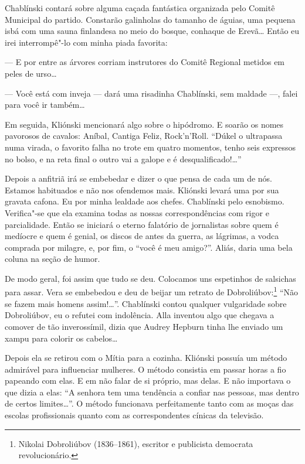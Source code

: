 Chablínski contará sobre alguma caçada fantástica organizada pelo Comitê Municipal do
partido. Constarão galinholas do tamanho de águias, uma pequena isbá com
uma sauna finlandesa no meio do bosque, conhaque de Erevã\ldots{} Então eu
irei interrompê"-lo com minha piada favorita:

--- E por entre as árvores corriam instrutores do Comitê Regional
metidos em peles de urso\ldots{}

--- Você está com inveja --- dará uma risadinha Chablínski, sem maldade
---, falei para você ir também\ldots{}

Em seguida, Kliónski mencionará algo sobre o hipódromo. E soarão os
nomes pavorosos de cavalos: Aníbal, Cantiga Feliz, Rock'n'Roll. ``Dúkel o ultrapassa numa virada, o favorito falha no trote em quatro momentos, tenho seis expressos no bolso, e na reta final o outro vai a galope e é desqualificado!\ldots{}''

Depois a anfitriã irá se embebedar e dizer o que pensa de cada um de
nós. Estamos habituados e não nos ofendemos mais. Kliónski levará uma
por sua gravata cafona. Eu por minha lealdade aos chefes. Chablínski
pelo esnobismo. Verifica"-se que ela examina todas as nossas
correspondências com rigor e parcialidade. Então se iniciará o eterno
falatório de jornalistas sobre quem é medíocre e quem é genial, os
discos de antes da guerra, as lágrimas, a vodca comprada por milagre, e,
por fim, o ``você é meu amigo?''. Aliás, daria uma bela coluna na seção
de humor.

De modo geral, foi assim que tudo se deu. Colocamos uns espetinhos de
salsichas para assar. Vera se embebedou e deu de beijar um retrato de
Dobroliúbov:\footnote{Nikolai Dobroliúbov (1836--1861), escritor e
  publicista democrata revolucionário.} ``Não se fazem mais homens
assim!\ldots{}''. Chablínski contou qualquer vulgaridade sobre Dobroliúbov,
eu o refutei com indolência. Alla inventou algo que chegava a comover de
tão inverossímil, dizia que Audrey Hepburn tinha lhe enviado um xampu
para colorir os cabelos\ldots{}

Depois ela se retirou com o Mítia para a cozinha. Kliónski possuía um
método admirável para influenciar mulheres. O método consistia em passar
horas a fio papeando com elas. E em não falar de si próprio, mas delas.
E não importava o que dizia a elas: ``A senhora tem uma tendência a
confiar nas pessoas, mas dentro de certos limites\ldots{}''. O método
funcionava perfeitamente tanto com as moças das escolas profissionais
quanto com as correspondentes cínicas da televisão.

